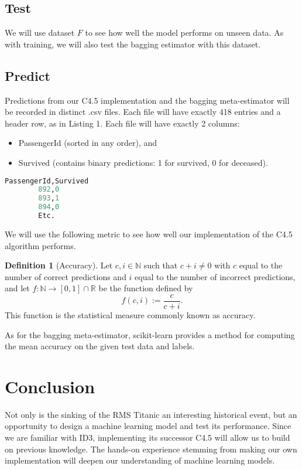 \documentclass[12pt]{amsproc}
\newcommand\N{{\mathbb N}}
\newcommand\R{{\mathbb R}}
\theoremstyle{definition}
\newtheorem{definition}{Definition}
\begin{document}
	\subsection{Test}\label{method:test}
	We will use dataset $F$ to see how well the model performs on unseen data. As with training, we will also test the bagging estimator with this dataset.
	
	\subsection{Predict}\label{method:predict}
	

	Predictions from our C4.5 implementation and the bagging meta-estimator will be recorded in distinct .csv files. Each file will have exactly 418 entries and a header row, as in Listing 1.  Each file will have exactly 2 columns:
	\begin{itemize}
		\item PassengerId (sorted in any order), and
		\item Survived (contains binary predictions: 1 for survived, 0 for deceased).
	\end{itemize}
	
	\begin{lstlisting}[language=Python, caption=Prediction example]
		PassengerId,Survived
		892,0
		893,1
		894,0
		Etc.\end{lstlisting}
		
	We will use the following metric to see how well our implementation of the C4.5 algorithm performs.

	\begin{definition}[Accuracy]\label{definition:accuracy}
		Let $c,i \in \N$ such that $c + i \neq 0$ with $c$ equal to the number of correct predictions and $i$ equal to the number of incorrect predictions, and let $f: \N \to [0,1] \cap \R$ be the function defined by   
		$$f(c,i) := \frac{c}{c + i}.$$
		This function is the statistical measure commonly known as accuracy. 
	\end{definition}
	
	As for the bagging meta-estimator, scikit-learn provides a method for computing the mean accuracy on the given test data and labels. 
	
	\section{Conclusion}\label{conclusions}
	Not only is the sinking of the RMS Titanic an interesting historical event, but an opportunity to design a machine learning model and test its performance. Since we are familiar with ID3, implementing its successor C4.5 will allow us to build on previous knowledge. The hands-on experience stemming from making our own implementation will deepen our understanding of machine learning models.

		
	
	
	
	
\end{document}
